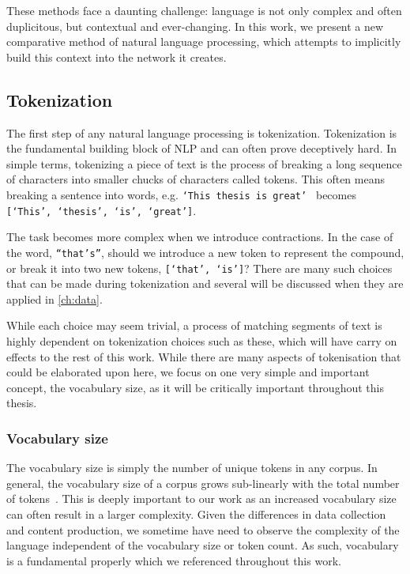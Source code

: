 These methods face a daunting challenge: language is not only complex and often duplicitous, but contextual and ever-changing. In this work, we present a new comparative method of natural language processing, which attempts to implicitly build this context into the network it creates.

\subsection{Tokenization}\label{sec:tokenization}
The first step of any natural language processing is tokenization. Tokenization is the fundamental building block of NLP and can often prove deceptively hard. In simple terms, tokenizing a piece of text is the process of breaking a long sequence of characters into smaller chucks of characters called tokens. This often means breaking a sentence into words, e.g. \texttt{`This thesis is great' } becomes \texttt{[`This', `thesis', `is',  `great']}.

The task becomes more complex when we introduce contractions. In the case of the word, \texttt{``that's''}, should we introduce a new token to represent the compound, or break it into two new tokens, \texttt{[`that', `is']}? There are many such choices that can be made during tokenization and several will be discussed when they are applied in \autoref{ch:data}.

While each choice may seem trivial, a process of matching segments of text is highly dependent on tokenization choices such as these, which will have carry on effects to the rest of this work. While there are many aspects of tokenisation that could be elaborated upon here, we focus on one very simple and important concept, the vocabulary size, as it will be critically important throughout this thesis. 


\subsubsection{Vocabulary size}\label{sec:background_vocab_sizes}


The vocabulary size is simply the number of unique tokens in any corpus. In general, the vocabulary size of a corpus grows sub-linearly with the total number of tokens~\cite{heaps1978information}. This is deeply important to our work as an increased vocabulary size can often result in a larger complexity. Given the differences in data collection and content production, we sometime have need to observe the complexity of the language independent of the vocabulary size or token count. As such, vocabulary is a fundamental properly which we referenced throughout this work.

